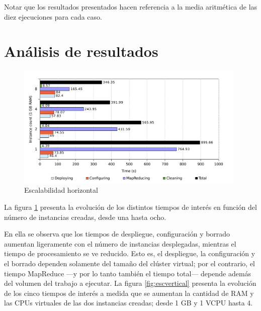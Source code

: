 Notar que los resultados presentados hacen referencia a la media aritm\'etica de las diez ejecuciones para cada caso. 


\section{An\'alisis de resultados}\label{sec:analisisresultados}

\begin{figure}[tbp]
\begin{center}
\includegraphics[width=0.98\textwidth]{imagenes/039.pdf}
\caption{Escalabilidad horizontal}
\label{fig:eschorizontal}
\end{center}
\end{figure}

\noindent La figura \ref{fig:eschorizontal} presenta la evoluci\'on de los distintos tiempos de inter\'es en funci\'on del n\'umero de instancias creadas, desde una hasta ocho. \newline

En ella se observa que los tiempos de despliegue, configuraci\'on y borrado aumentan ligeramente con el n\'umero de instancias desplegadas, mientras el tiempo de procesamiento se ve reducido. Esto es, el despliegue, la con\-fi\-gu\-ra\-ci\'on y el borrado dependen solamente del tama\~no del cl\'uster virtual; por el contrario, el tiempo MapReduce ---y por lo tanto tambi\'en el tiempo total--- depende adem\'as del volumen del trabajo a ejecutar. La figura \ref{fig:escvertical} presenta la evoluci\'on de los cinco tiempos de inter\'es a medida que se aumentan la cantidad de RAM y las CPUs virtuales de las dos instancias creadas; desde 1 GB y 1 VCPU hasta 4. \newline


